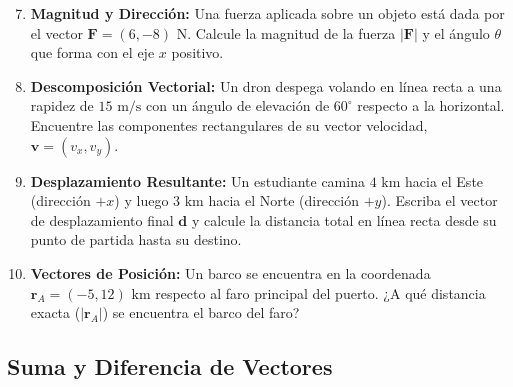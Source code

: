 \documentclass[11pt,a4paper]{book}
\begin{document}
\begin{enumerate}
    \setcounter{enumi}{6}
    \item \textbf{Magnitud y Dirección:} Una fuerza aplicada sobre un objeto está dada por el vector $\boldsymbol{F} = (6, -8) \text{ N}$. Calcule la magnitud de la fuerza $|\boldsymbol{F}|$ y el ángulo $\theta$ que forma con el eje $x$ positivo.
    
    \item \textbf{Descomposición Vectorial:} Un dron despega volando en línea recta a una rapidez de $15 \text{ m/s}$ con un ángulo de elevación de $60^\circ$ respecto a la horizontal. Encuentre las componentes rectangulares de su vector velocidad, $\boldsymbol{v} = (v_x, v_y)$.
    
    \item \textbf{Desplazamiento Resultante:} Un estudiante camina $4 \text{ km}$ hacia el Este (dirección $+x$) y luego $3 \text{ km}$ hacia el Norte (dirección $+y$). Escriba el vector de desplazamiento final $\boldsymbol{d}$ y calcule la distancia total en línea recta desde su punto de partida hasta su destino.
    
    \item \textbf{Vectores de Posición:} Un barco se encuentra en la coordenada $\boldsymbol{r}_A = (-5, 12) \text{ km}$ respecto al faro principal del puerto. ¿A qué distancia exacta ($|\boldsymbol{r}_A|$) se encuentra el barco del faro?
\end{enumerate}

\subsection*{Suma y Diferencia de Vectores}
\end{document}
